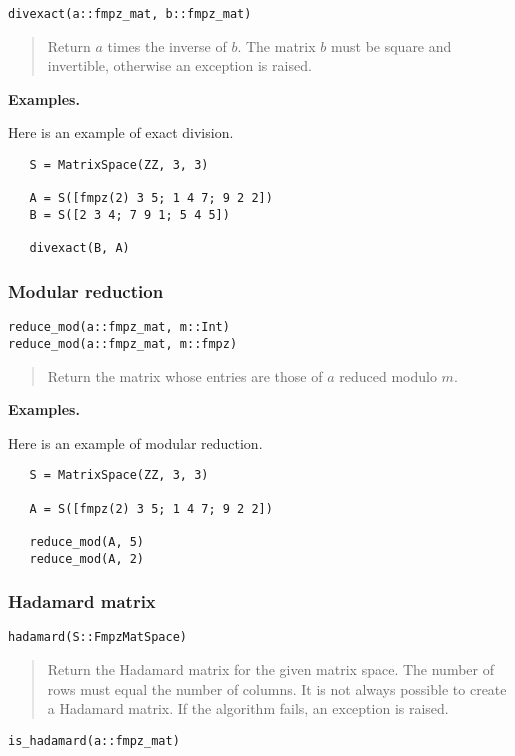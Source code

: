 \documentclass[a4paper,10pt]{article}
\newcommand{\desc}[1]{\vspace{-3mm}\begin{quote}#1\end{quote}}
\begin{document}
{{\begin{lstlisting}
divexact(a::fmpz_mat, b::fmpz_mat)
\end{lstlisting}

\desc{Return $a$ times the inverse of $b$. The matrix $b$ must be square and
invertible, otherwise an exception is raised.}

\textbf{Examples.}

Here is an example of exact division.

\begin{lstlisting}
   S = MatrixSpace(ZZ, 3, 3)

   A = S([fmpz(2) 3 5; 1 4 7; 9 2 2])
   B = S([2 3 4; 7 9 1; 5 4 5])
 
   divexact(B, A)
\end{lstlisting}

\subsubsection{Modular reduction}

\begin{lstlisting}
reduce_mod(a::fmpz_mat, m::Int)
reduce_mod(a::fmpz_mat, m::fmpz)
\end{lstlisting}

\desc{Return the matrix whose entries are those of $a$ reduced modulo $m$.}

\textbf{Examples.}

Here is an example of modular reduction.

\begin{lstlisting}
   S = MatrixSpace(ZZ, 3, 3)

   A = S([fmpz(2) 3 5; 1 4 7; 9 2 2])
   
   reduce_mod(A, 5)
   reduce_mod(A, 2)
\end{lstlisting}

\subsubsection{Hadamard matrix}

\begin{lstlisting}
hadamard(S::FmpzMatSpace)
\end{lstlisting}

\desc{Return the Hadamard matrix for the given matrix space. The number of rows must
equal the number of columns. It is not always possible to create a Hadamard matrix.
If the algorithm fails, an exception is raised.}

\begin{lstlisting}
is_hadamard(a::fmpz_mat)
\end{lstlisting}

}}
\end{document}
